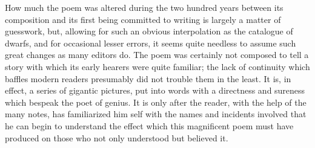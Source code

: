 \documentclass{scrbook}
\begin{document}
How much the poem was altered during the two hundred years between its composition and its first being committed to writing is largely a matter of guesswork, but, allowing for such an obvious interpolation as the catalogue of dwarfs, and for occasional lesser errors, it seems quite needless to assume such great changes as many editors do. The poem was certainly not composed to tell a story with which its early hearers were quite familiar; the lack of continuity which baffles modern readers presumably did not trouble them in the least. It is, in effect, a series of gigantic pictures, put into words with a directness and sureness which bespeak the poet of genius. It is only after the reader, with the help of the many notes, has familiarized him self with the names and incidents involved that he can begin to understand the effect which this magnificent poem must have produced on those who not only understood but believed it.

\pagebreak


\end{document}
